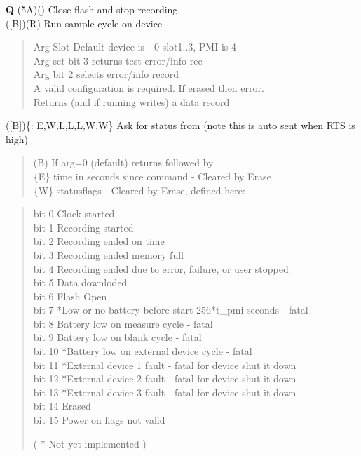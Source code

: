 {\textbf{Q} (5A)() Close flash and stop recording.}\\

{ ({[}B{]})(R) Run sample cycle on device}
\begin{quote}
	Arg Slot Default device is \instType{} - 0 slot1..3, PMI is 4\\
	Arg set bit 3 returns test error/info rec\\
	Arg bit 2 selects error/info record\\
	A valid configuration is required. If erased then error.\\
	Returns (and if running writes) a data record\\
\end{quote}

{ ({[}B{]})\{: E,W,L,L,L,W,W\} Ask for status from \instType{} (note
this is auto sent when RTS is high)}
\begin{quote}
	(B) If arg=0 (default) returns \cmdfont{:} followed by \cmdfont{:}\\
	\{E\} time in seconds since  command - Cleared by Erase\\
	\{W\} statusflags - Cleared by Erase, defined here:
\end{quote}

\begin{quote}
	bit 0 Clock started\\
	bit 1 Recording started\\
	bit 2 Recording ended on time\\
	bit 3 Recording ended memory full\\
	bit 4 Recording ended due to error, failure, or user stopped\\
	bit 5 Data downloded\\
	bit 6 Flash Open\\
	bit 7 *Low or no battery before start 256*t\_pmi seconds - fatal\\
	bit 8 Battery low on measure cycle - fatal\\
	bit 9 Battery low on blank cycle - fatal\\
	bit 10 *Battery low on external device cycle - fatal\\
	bit 11 *External device 1 fault - fatal for device shut it down\\
	bit 12 *External device 2 fault - fatal for device shut it down\\
	bit 13 *External device 3 fault - fatal for device shut it down\\
	bit 14 Erased\\
	bit 15 Power on flags not valid
	
	( * Not yet implemented )\\
\end{quote}

